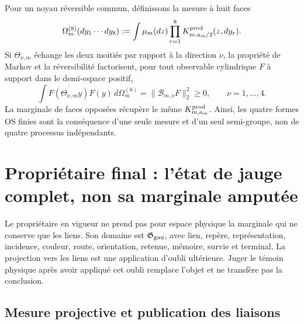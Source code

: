 Pour un noyau réversible commun, définissons la mesure à huit faces
\begin{equation}\label{eq:pdf2-ym-ocho-caras}
 \Omega_m^{(8)}(dy_1\cdots dy_8)
 :=\int\mu_m(dz)\prod_{r=1}^{8}K^{\rm prod}_{m,a_m/2}(z,dy_r).
\end{equation}
Si $\Theta_{\nu,m}$ échange les deux moitiés par rapport à la direction $\nu$, la propriété de Markov et la réversibilité factorisent, pour tout observable cylindrique $F$ à support dans le demi-espace positif,
\begin{equation}\label{eq:pdf2-ym-os-finita}
 \int\overline{F(\Theta_{\nu,m}y)}F(y)\,d\Omega_m^{(8)}
 =\|\mathcal B_{m,\nu}F\|_2^2\ge0,
 \qquad \nu=1,\ldots,4.
\end{equation}
La marginale de faces opposées récupère le même
$K^{\rm prod}_{m,a_m}$. Ainsi, les quatre formes OS finies sont
la conséquence d’une seule mesure et d’un seul semi-groupe, non de quatre processus
indépendants.

\section{Propriétaire final : l'état de jauge complet, non sa marginale amputée}

Le propriétaire en vigueur ne prend pas pour espace physique la marginale qui ne conserve que
les liens. Son domaine est $\mathfrak G_{\rm gau}$, avec lien, repère,
représentation, incidence, couleur, route, orientation,
retenue, mémoire, survie et terminal. La projection vers les liens est une application
d’oubli ultérieure. Juger le témoin physique après avoir appliqué cet oubli remplace
l’objet et ne transfère pas la conclusion.

\subsection{Mesure projective et publication des liaisons}


